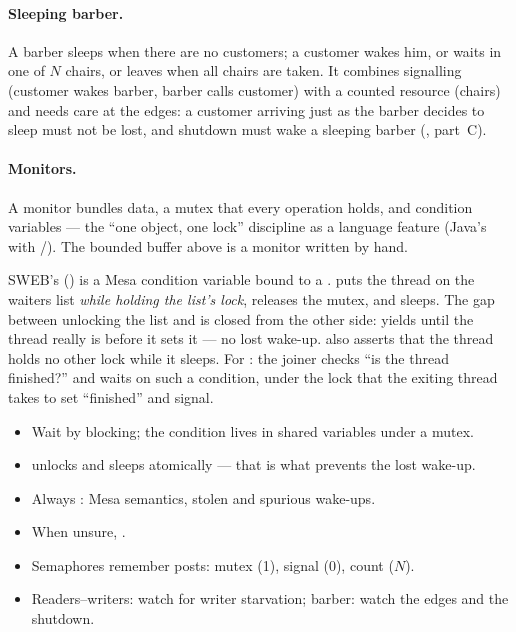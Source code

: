 \paragraph{Sleeping barber.} A barber sleeps when there are no customers;
a customer wakes him, or waits in one of $N$ chairs, or leaves when all
chairs are taken. It combines signalling (customer wakes barber, barber
calls customer) with a counted resource (chairs) and needs care at the
edges: a customer arriving just as the barber decides to sleep must not
be lost, and shutdown must wake a sleeping barber (, part~C).

\paragraph{Monitors.} A monitor bundles data, a mutex that every
operation holds, and condition variables --- the ``one object, one lock''
discipline as a language feature (Java's  with
/). The bounded buffer above is a monitor written
by hand.

\begin{swebbox}
SWEB's  () is a
Mesa condition variable bound to a .  puts the
thread on the waiters list \emph{while holding the list's lock}, releases
the mutex, and sleeps. The gap between unlocking the list and
 is closed from the other side:
 yields until the thread really is
 before it sets it  --- no lost wake-up.
 also asserts that the thread holds no other lock
while it sleeps. For : the joiner checks ``is the
thread finished?'' and waits on such a condition, under the lock that the
exiting thread takes to set ``finished'' and signal.
\end{swebbox}

\begin{keybox}
\begin{itemize}
  \item Wait by blocking; the condition lives in shared variables under a
    mutex.
  \item {} unlocks and sleeps atomically --- that is what
    prevents the lost wake-up.
  \item Always : Mesa semantics, stolen and
    spurious wake-ups.
  \item When unsure, .
  \item Semaphores remember posts: mutex (1), signal (0), count ($N$).
  \item Readers--writers: watch for writer starvation; barber: watch the
    edges and the shutdown.
\end{itemize}
\end{keybox}
